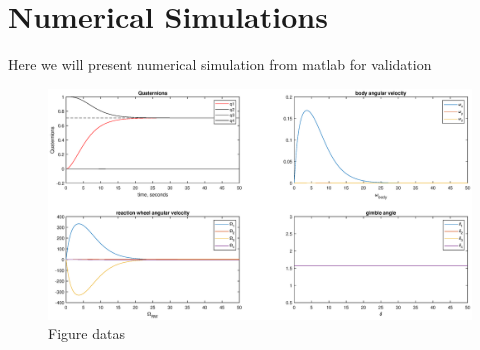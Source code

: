 \chapter{Numerical Simulations}
Here we will present numerical simulation from matlab for validation
\begin{figure}

\includegraphics[width=1.0\textwidth]{figures/fig4}
\caption{Figure datas}
\label{fig:figd}
\end{figure}
